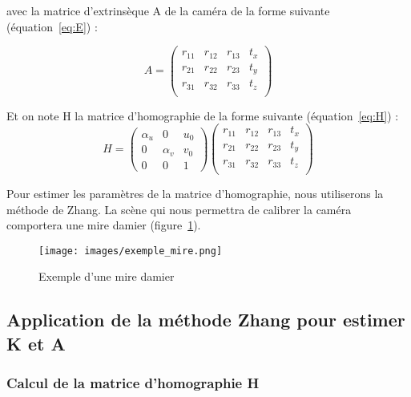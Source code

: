 \documentclass[12pt]{article}
\begin{document}
avec la matrice d'extrinsèque A de la caméra de la forme suivante (équation~\ref{eq:E}) :

\begin{equation}
    A = 
\begin{pmatrix}
r_{11} & r_{12} & r_{13} & t_x \\
r_{21} & r_{22} & r_{23} & t_y \\
r_{31} & r_{32} & r_{33} & t_z \\
\end{pmatrix}
\label{eq:E}
\end{equation}

Et on note H la matrice d'homographie de la forme suivante (équation~\ref{eq:H}) :
\begin{equation}
    H =
\begin{pmatrix}
\alpha_{u} & 0 & u_0 \\
0 & \alpha_{v} & v_0 \\
0 & 0 & 1
\end{pmatrix}
\begin{pmatrix}
r_{11} & r_{12} & r_{13} & t_x \\
r_{21} & r_{22} & r_{23} & t_y \\
r_{31} & r_{32} & r_{33} & t_z \\
\end{pmatrix}
\label{eq:H}
\end{equation}

Pour estimer les paramètres de la matrice d'homographie, nous utiliserons la méthode de Zhang.
La scène qui nous permettra de calibrer la caméra comportera une mire damier (figure~\ref{fig:chessboard}).

\begin{figure}[H]
\centering
\texttt{[image: images/exemple\_mire.png]}
\caption{Exemple d'une mire damier}
\label{fig:chessboard}
\end{figure}

\subsection{Application de la méthode Zhang pour estimer K et A}

\subsubsection{Calcul de la matrice d'homographie H}
\end{document}
